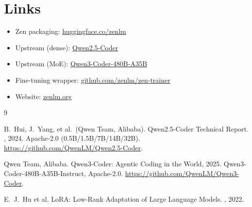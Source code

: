 \documentclass[11pt,a4paper]{article}
\begin{document}
\section*{Links}

\begin{itemize}
    \item Zen packaging: \href{https://huggingface.co/zenlm}{huggingface.co/zenlm}
    \item Upstream (dense): \href{https://huggingface.co/Qwen}{Qwen2.5-Coder} \cite{qwen25coder}
    \item Upstream (MoE): \href{https://huggingface.co/Qwen}{Qwen3-Coder-480B-A35B} \cite{qwen3coder}
    \item Fine-tuning wrapper: \href{https://github.com/zenlm/zen-trainer}{github.com/zenlm/zen-trainer}
    \item Website: \href{https://zenlm.org}{zenlm.org}
\end{itemize}

\begin{thebibliography}{9}

B.~Hui, J.~Yang, et al.\ (Qwen Team, Alibaba).
\newblock Qwen2.5-Coder Technical Report.
, 2024. Apache-2.0 (0.5B/1.5B/7B/14B/32B).
\newblock \url{https://github.com/QwenLM/Qwen2.5-Coder}.

Qwen Team, Alibaba.
\newblock Qwen3-Coder: Agentic Coding in the World, 2025.
\newblock Qwen3-Coder-480B-A35B-Instruct, Apache-2.0.
\newblock \url{https://github.com/QwenLM/Qwen3-Coder}.

E.~J.~Hu et al.
\newblock LoRA: Low-Rank Adaptation of Large Language Models.
, 2022.

\end{thebibliography}
\end{document}

